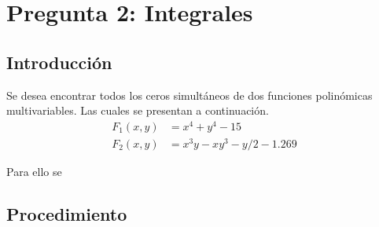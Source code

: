 \documentclass[letterpaper,11pt]{article} %
\begin{document}
\section{Pregunta 2: Integrales}
\subsection{Introducción}
Se desea encontrar todos los ceros simultáneos de dos funciones polinómicas multivariables. Las cuales se presentan a continuación.
  \begin{align}
    F_1(x, y) &= x^4 + y^4 - 15 \label{eq1}\\
    F_2(x, y) &= x^3y - xy^3 - y/2 - 1.269 \label{eq2}
  \end{align}

Para ello se 
\subsection{Procedimiento}    
% 


\end{document}
